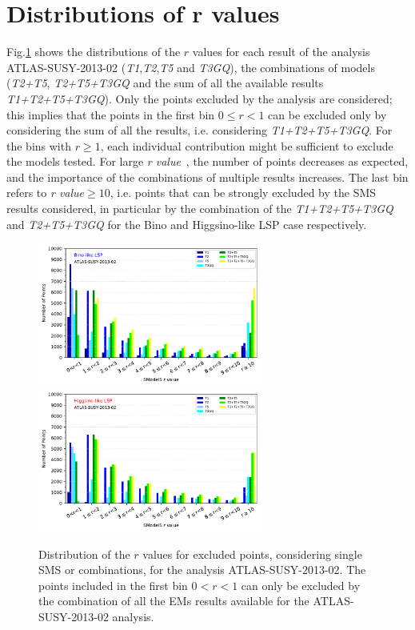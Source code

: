 \documentclass[a4paper,11pt]{article}
\newcommand{\RVALUE}{\textit{r value}}
\begin{document}
\section{Distributions of r values}
Fig.\ref{Histos_r} shows the distributions of the $r$ values for each result of the analysis ATLAS-SUSY-2013-02 (\textit{T1},\textit{T2},\textit{T5} and \textit{T3GQ}), the combinations of models (\textit{T2+T5}, \textit{T2+T5+T3GQ} and the sum of all the available results \textit{T1+T2+T5+T3GQ}). Only the points excluded by the analysis are considered; this implies that the points in the first bin $0\leq r < 1$ can be excluded only by considering the sum of all the results, i.e. considering \textit{T1+T2+T5+T3GQ}. For the bins with $r \geq 1$, each individual contribution might be sufficient to exclude the models tested. For large \RVALUE~, the number of points decreases as expected, and the importance of the combinations of multiple results increases. The last bin refers to \RVALUE$\geq 10$, i.e. points that can be strongly excluded by the SMS results considered, in particular by the combination of the \textit{T1+T2+T5+T3GQ} and \textit{T2+T5+T3GQ} for the Bino and Higgsino-like LSP case respectively. 
\begin{figure}[!h]
	\begin{center}
		\subfigure
		{\includegraphics[width=0.66\textwidth]{PLOTS/Combination/ATLAS-SUSY-2013-02_Bino_rValuesHisto.pdf}}
		\subfigure
		{\includegraphics[width=0.66\textwidth]{PLOTS/Combination/ATLAS-SUSY-2013-02_Higgsino_rValuesHisto.pdf}}
	\end{center}
	\caption{Distribution of the $r$ values for excluded points, considering single SMS or combinations, for the analysis ATLAS-SUSY-2013-02. The points included in the first bin $0<r < 1$ can only be excluded by the combination of all the EMs results available for the ATLAS-SUSY-2013-02 analysis.} 
	\label{Histos_r}
\end{figure}


%
%
%
%
\end{document}
